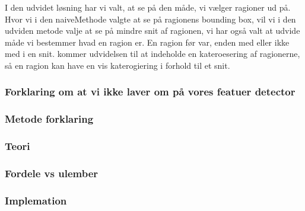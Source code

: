 I den udvidet løsning har vi valt, at se på den måde, vi vælger ragioner
ud på. Hvor vi i den naiveMethode valgte at se på ragionens bounding
box, vil vi i den udviden metode valje at se på mindre snit af ragionen,
vi har også valt at udvide måde vi bestemmer hvad en ragion er. En
ragion før var, enden med eller ikke med i en snit. kommer udvidelsen
til at indeholde en kateroesering af ragionerne, så en ragion kan have
en vis katerogiering i forhold til et snit.


\subsubsection{Forklaring om at vi ikke laver om på vores featuer detector}

\subsubsection{Metode forklaring}

\subsubsection{Teori}

\subsubsection{Fordele vs ulember}

\subsubsection{Implemation}
